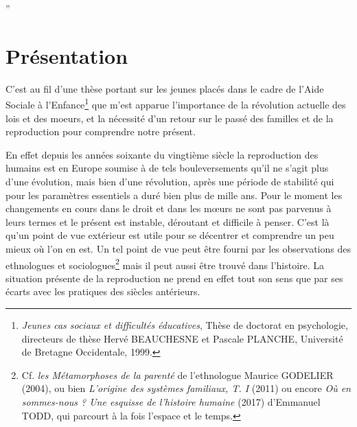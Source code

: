 

”\chapter{Présentation}







C'est au fil d'une thèse portant sur les jeunes placés dans le cadre de l'Aide Sociale à l'Enfance\footnote{\emph{Jeunes cas sociaux et difficultés éducatives}, Thèse de doctorat en psychologie, directeurs de thèse Hervé BEAUCHESNE et Pascale PLANCHE, Université de Bretagne Occidentale, 1999.} que m'est apparue l'importance de la révolution actuelle des lois et des moeurs, et la nécessité d'un retour sur le passé des familles et de la reproduction pour comprendre notre présent. 

En effet depuis les années soixante du vingtième siècle la reproduction des humains est en Europe soumise à de tels bouleversements qu'il ne s'agit plus d'une évolution, mais bien d'une révolution, après une période de stabilité qui pour les paramètres essentiels a duré bien plus de mille ans. Pour le moment les changements en cours dans le droit et dans les mœurs ne sont pas parvenus à leurs termes et le présent est instable, déroutant et difficile à penser. C'est là qu'un point de vue extérieur est utile pour se décentrer et comprendre un peu mieux où l'on en est. Un tel point de vue peut être fourni par les observations des ethnologues et sociologues\footnote{Cf. \emph{les Métamorphoses de la parenté} de l'ethnologue Maurice GODELIER (2004), ou bien \emph{L'origine des systèmes familiaux, T. I} (2011) ou encore \emph{Où en sommes-nous ? Une esquisse de l'histoire humaine} (2017) d'Emmanuel TODD, qui parcourt à la fois l'espace et le temps.} mais il peut aussi être trouvé dans l'histoire. La situation présente de la reproduction ne prend en effet tout son sens que par ses écarts avec les pratiques des siècles antérieurs.

